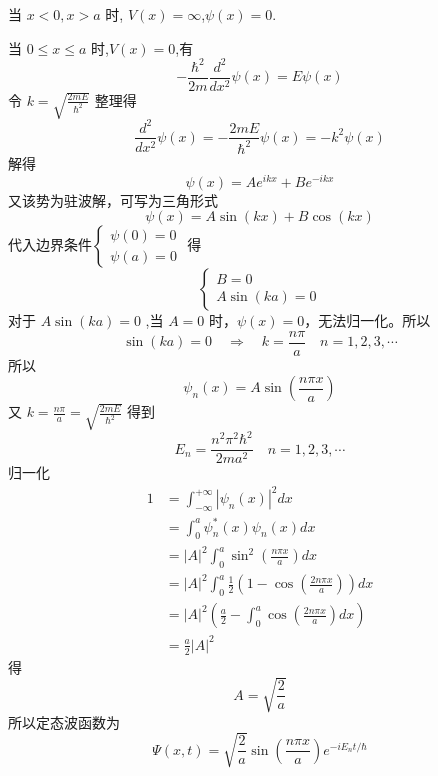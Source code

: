 \documentclass[12pt, a4paper, oneside, UTF8]{ctexbook}
\begin{document}
当 $x<0, x>a$ 时, $V(x)=\infty$,$\psi(x)=0$.

当 $0\leqslant x \leqslant a$ 时,$V(x)=0$,有
\begin{equation}
    -\frac{\hbar^2}{2m}\frac{d^2}{dx^2}\psi(x)=E\psi(x)
\end{equation}
令 $\displaystyle k=\sqrt{\frac{2mE}{\hbar^2}}$ 整理得 
\begin{equation}
    \frac{d^2}{dx^2}\psi(x) = -\frac{2mE}{\hbar^2}\psi(x) = -k^2\psi(x)
\end{equation}
解得
\begin{equation}
    \psi(x)=Ae^{ikx}+Be^{-ikx}
\end{equation}
又该势为驻波解，可写为三角形式
\begin{equation}
    \psi(x)=A\sin(kx)+B\cos(kx)
\end{equation}
代入边界条件$\begin{cases} \psi(0)=0\\ \psi(a)=0 \end{cases}$ 得
\begin{equation}
    \begin{cases}
        B = 0 \\
        A\sin(ka)=0
    \end{cases}
\end{equation}
对于 $A\sin(ka)=0$ ,当 $A=0$ 时，$\psi(x)=0$，无法归一化。所以
\begin{equation}
    \sin(ka)=0 \quad \Rightarrow \quad k=\frac{n\pi}{a} \quad n=1,2,3,\cdots
\end{equation}
所以
\begin{equation}
    \psi_n(x) = A \sin\left(\frac{n\pi x}{a}\right)
\end{equation}
又 $\displaystyle k=\frac{n\pi}{a} = \sqrt{\frac{2mE}{\hbar^2}}$ 得到
\begin{equation}
    \boxed{E_n=\frac{n^2\pi^2\hbar^2}{2ma^2} \quad n=1,2,3,\cdots}
\end{equation}
归一化
\begin{equation}
    \begin{aligned}
        1 &=\int_{-\infty}^{+\infty}\left| \psi_n(x) \right|^2 dx  \\
        &=\int_{0}^a \psi_n^*(x)\psi_n(x) dx  \\
        &= \left|A\right|^2 \int_{0}^a \sin^2\left(\frac{n\pi x}{a}\right) dx\\
        &= \left|A\right|^2 \int_{0}^a \frac{1}{2}\left(1-\cos(\frac{2n\pi x}{a})\right) dx\\
        &= \left|A\right|^2 \left( \frac{a}{2} - \int_{0}^a\cos(\frac{2n\pi x}{a}) dx\right)\\
        &= \frac{a}{2}\left|A\right|^2
    \end{aligned}
\end{equation}
得 
\begin{equation}
    A = \sqrt{\frac{2}{a}}
\end{equation}
所以定态波函数为
\begin{equation}
    \boxed{\Psi(x,t) = \sqrt{\frac{2}{a}} \sin\left(\frac{n\pi x}{a}\right) e^{-iE_nt/\hbar}}
\end{equation}
\end{document}
